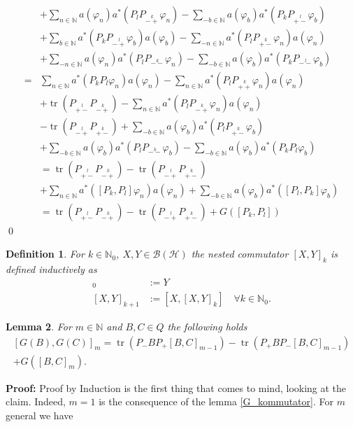 \documentclass[b5paper,draft,openbib,12pt]{memoir}
\newtheorem{Def}{Definition}
\newtheorem{Lemma}[Def]{Lemma}
\DeclareMathOperator{\tr}{tr}
\begin{document}
\begin{align*}
&+\sum_{n\in\mathbb{N}}a(\varphi_n)a^*\left(P_l P_{\stackrel{k}{-+}}\varphi_n\right) - \sum_{-b\in\mathbb{N}} a(\varphi_b)a^*\left(P_k P_{\stackrel{l}{+-}}\varphi_b\right)\\
&+\sum_{b\in\mathbb{N}}a^*\left(P_k P_{\stackrel{l}{-+}}\varphi_b\right)a(\varphi_b)-\sum_{-n\in\mathbb{N}}a^*\left(P_l P_{\stackrel{k}{+-}}\varphi_n\right) a(\varphi_n)\\
&+\sum_{-n\in\mathbb{N}}a(\varphi_n)a^*\left(P_l P_{\stackrel{k}{--}}\varphi_n\right) - \sum_{-b \in \mathbb{N}} a(\varphi_b)a^*\left(P_k P_{\stackrel{l}{--}}\varphi_b\right)\\
=&\sum_{n\in\mathbb{N}} a^*\left(P_k P_l \varphi_n \right) a(\varphi_n) - \sum_{n\in\mathbb{N}} a^*\left(P_l P_{\stackrel{k}{++}} \varphi_n \right) a(\varphi_n)\\
&+\tr \left( P_{\stackrel{l}{+-}} P_{\stackrel{k}{-+}}\right) - \sum_{n\in\mathbb{N}} a^*\left( P_l P_{\stackrel{k}{-+}} \varphi_n\right)a(\varphi_n)\\
&-\tr \left( P_{\stackrel{l}{-+}} P_{\stackrel{k}{+-}}\right) + \sum_{-b\in\mathbb{N}} a(\varphi_b) a^*\left(P_l P_{\stackrel{k}{+-}} \varphi_b\right)\\
&+\sum_{-b\in\mathbb{N}} a(\varphi_b) a^*\left( P_l P_{\stackrel{k}{--}}\varphi_b\right) - \sum_{-b\in\mathbb{N}} a(\varphi_b) a^*\left( P_k P_l \varphi_b\right)\\
&=\tr \left( P_{\stackrel{l}{+-}} P_{\stackrel{k}{-+}}\right)
-\tr \left( P_{\stackrel{l}{-+}} P_{\stackrel{k}{+-}}\right)\\
&+\sum_{n\in\mathbb{N}} a^*\left(\left[P_k ,P_l\right] \varphi_n \right) a(\varphi_n)
+\sum_{-b\in\mathbb{N}} a(\varphi_b)a^*\left(\left[P_l ,P_k\right] \varphi_b \right) \\
&=\tr \left( P_{\stackrel{l}{+-}} P_{\stackrel{k}{-+}}\right)
-\tr \left( P_{\stackrel{l}{-+}} P_{\stackrel{k}{+-}}\right)
+G\left(\left[P_k,P_l\right]\right)
\end{align*}
\qed

\begin{Def}
For \(k\in\mathbb{N}_0\), \(X,Y\in \mathcal{B}(\mathcal{H})\) the nested commutator \([X,Y]_k\) is defined inductively as
\begin{align*}
[X,Y]_0&:= Y\\
[X,Y]_{k+1}&:=[X,[X,Y]_{k}] \quad \forall k\in\mathbb{N}_0.
\end{align*}
\end{Def}

\begin{Lemma}\label{nested_kommuted_G}
For \(m\in\mathbb{N}\) and \(B,C \in Q\) the following holds
\begin{multline}
\left[ G(B),G(C)\right]_m=  \tr\left(P_-BP_+[B,C]_{m-1}\right) - \tr\left(P_+BP_-[B,C]_{m-1}\right)\\
+G\left([B,C]_m\right) .
\end{multline}
\end{Lemma}
\textbf{Proof:} Proof by Induction is the first thing that comes to mind, looking at the claim. Indeed, \(m=1\) is the consequence
of the lemma \ref{G_kommutator}. For \(m\) general we have
\end{document}
